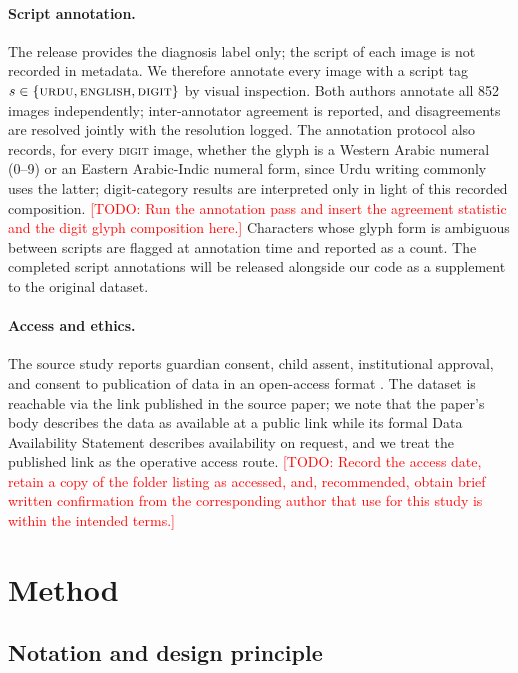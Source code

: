 \documentclass[11pt,a4paper]{article}
\newcommand{\todonote}[1]{\textcolor{red}{[TODO: #1]}}
\begin{document}
\paragraph{Script annotation.} The release provides the diagnosis
label only; the script of each image is not recorded in metadata. We
therefore annotate every image with a script tag
$s \in \{\textsc{urdu}, \textsc{english}, \textsc{digit}\}$ by visual
inspection. Both authors annotate all 852 images independently;
inter-annotator agreement is reported, and disagreements are resolved
jointly with the resolution logged. The annotation protocol also
records, for every \textsc{digit} image, whether the glyph is a
Western Arabic numeral (0--9) or an Eastern Arabic-Indic numeral
form, since Urdu writing commonly uses the latter; digit-category
results are interpreted only in light of this recorded composition.
\todonote{Run the annotation pass and insert the agreement statistic
and the digit glyph composition here.} Characters whose glyph form is
ambiguous between scripts are flagged at annotation time and reported
as a count. The completed script annotations will be released
alongside our code as a supplement to the original dataset.

\paragraph{Access and ethics.} The source study reports guardian
consent, child assent, institutional approval, and consent to
publication of data in an open-access format \citep{kashif2026}. The
dataset is reachable via the link published in the source paper; we
note that the paper's body describes the data as available at a
public link while its formal Data Availability Statement describes
availability on request, and we treat the published link as the
operative access route. \todonote{Record the access date, retain a
copy of the folder listing as accessed, and, recommended, obtain
brief written confirmation from the corresponding author that use for
this study is within the intended terms.}

\section{Method}
\label{sec:method}

\subsection{Notation and design principle}
\end{document}
